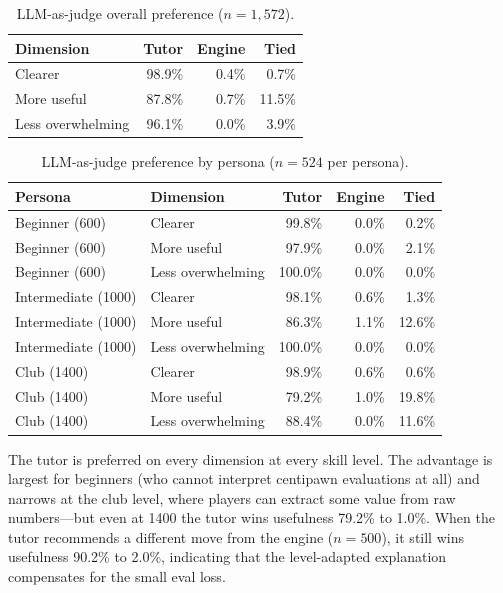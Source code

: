 \documentclass[11pt]{article}
\begin{document}
\begin{table}[h]
\centering
\caption{LLM-as-judge overall preference ($n=1{,}572$).}
\label{tab:llm-judge-overall}
\begin{tabular}{@{}lrrr@{}}
\toprule
Dimension & Tutor & Engine & Tied \\
\midrule
Clearer            & 98.9\% & 0.4\% & 0.7\% \\
More useful        & 87.8\% & 0.7\% & 11.5\% \\
Less overwhelming  & 96.1\% & 0.0\% & 3.9\% \\
\bottomrule
\end{tabular}
\end{table}

\begin{table}[h]
\centering
\caption{LLM-as-judge preference by persona ($n=524$ per persona).}
\label{tab:llm-judge-persona}
\begin{tabular}{@{}llrrr@{}}
\toprule
Persona & Dimension & Tutor & Engine & Tied \\
\midrule
Beginner (600)      & Clearer           & 99.8\% & 0.0\% & 0.2\% \\
Beginner (600)      & More useful       & 97.9\% & 0.0\% & 2.1\% \\
Beginner (600)      & Less overwhelming & 100.0\% & 0.0\% & 0.0\% \\
\addlinespace
Intermediate (1000) & Clearer           & 98.1\% & 0.6\% & 1.3\% \\
Intermediate (1000) & More useful       & 86.3\% & 1.1\% & 12.6\% \\
Intermediate (1000) & Less overwhelming & 100.0\% & 0.0\% & 0.0\% \\
\addlinespace
Club (1400)         & Clearer           & 98.9\% & 0.6\% & 0.6\% \\
Club (1400)         & More useful       & 79.2\% & 1.0\% & 19.8\% \\
Club (1400)         & Less overwhelming & 88.4\% & 0.0\% & 11.6\% \\
\bottomrule
\end{tabular}
\end{table}

The tutor is preferred on every dimension at every skill level. The advantage is largest for beginners (who cannot interpret centipawn evaluations at all) and narrows at the club level, where players can extract some value from raw numbers---but even at 1400 the tutor wins usefulness 79.2\% to 1.0\%. When the tutor recommends a different move from the engine ($n=500$), it still wins usefulness 90.2\% to 2.0\%, indicating that the level-adapted explanation compensates for the small eval loss.
\end{document}
